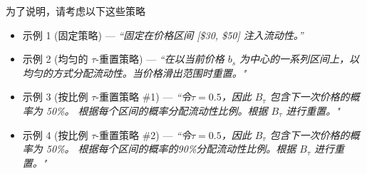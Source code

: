 \documentclass[sigconf, dvipsnames]{acmart}
\begin{document}
\fi

为了说明，请考虑以下这些策略


\begin{itemize}
    \item[] 示例 1 (固定策略) --- \textit{``固定在价格区间 [\$30, \$50] 注入流动性。''}
\end{itemize}

\begin{itemize}
    \item[] 示例 2 (均匀的 $\tau$-重置策略) --- \textit{``在以当前价格 $b_s$ 为中心的一系列区间上，以均匀的方式分配流动性。当价格滑出范围时重置。"}
\end{itemize}


\begin{itemize}
    \item[] 示例 3 (按比例 $\tau$-重置策略 \#1) --- \textit{``令$\tau=0.5$，因此 $B_{\tau}$ 包含下一次价格的概率为 50\%。
    根据每个区间的概率分配流动性比例。根据 $B_\tau$ 进行重置。"}
\end{itemize}

\begin{itemize}
    \item[] 示例 4 (按比例 $\tau$-重置策略 \#2) --- \textit{``令$\tau=0.5$，因此 $B_{\tau}$ 包含下一次价格的概率为 50\%。
    根据每个区间的概率的90\%分配流动性比例。根据 $B_\tau$ 进行重置。"}
\end{itemize}


\end{document}
